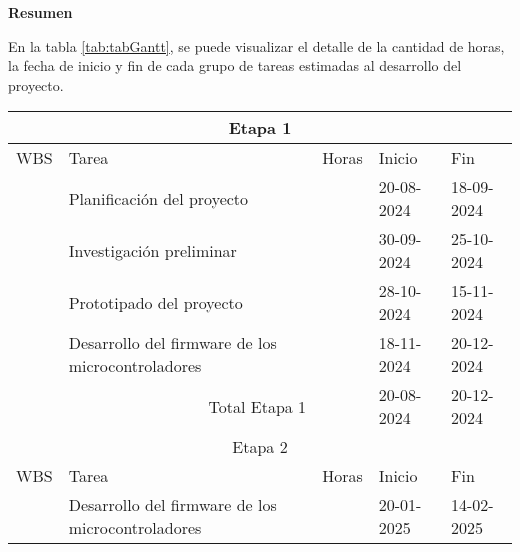 \textbf{Resumen}

En la tabla \ref{tab:tabGantt}, se puede visualizar el detalle de la cantidad
de horas, la fecha de inicio y fin de cada grupo de tareas estimadas al
desarrollo del proyecto.

\begin{table}[ht]
	\begin{tabularx}{\linewidth}{|p{0.8cm}|p{8.33cm}|p{1cm}|p{1.8cm}|p{1.8cm}|}
		\hline
		\multicolumn{5}{|c|}{Etapa 1}                                                                                                       \\ \hline
		\rowcolor[HTML]{C0C0C0}
		WBS                                 & Tarea                                             & Horas           & Inicio     & Fin        \\ \hline
		\centering{1}                       & Planificación del proyecto                        & \raggedleft{50} & 20-08-2024 & 18-09-2024 \\ \hline
		\centering{2}                       & Investigación preliminar                          & \raggedleft{80} & 30-09-2024 & 25-10-2024 \\ \hline
		\centering{3}                       & Prototipado del proyecto                          & \raggedleft{30} & 28-10-2024 & 15-11-2024 \\ \hline
		\centering{4}                       & Desarrollo del firmware de los microcontroladores & \raggedleft{67} & 18-11-2024 & 20-12-2024 \\ \hline
		\multicolumn{2}{|r|}{Total Etapa 1} & \raggedleft{227}                                  & 20-08-2024      & 20-12-2024              \\ \hline
		\multicolumn{5}{|c|}{Etapa 2}                                                                                                       \\ \hline
		\rowcolor[HTML]{C0C0C0}
		WBS                                 & Tarea                                             & Horas           & Inicio     & Fin        \\ \hline
		\centering{4}                       & Desarrollo del firmware de los microcontroladores & \raggedleft{60} & 20-01-2025 & 14-02-2025 \\ \hline

\end{tabularx}
\end{table}
